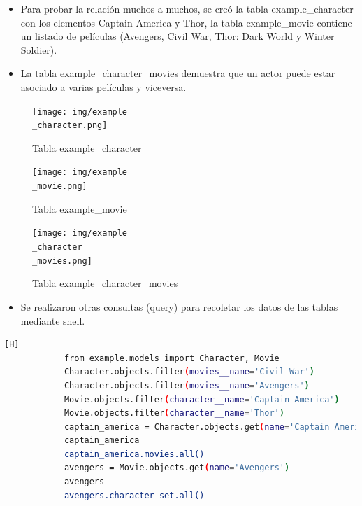 \documentclass{article}
\begin{document}
        \begin{itemize}
            \item Para probar la relación muchos a muchos, se creó la tabla example\_character con los elementos Captain America y Thor, la tabla example\_movie contiene un listado de películas (Avengers, Civil War, Thor: Dark World y Winter Soldier). 
            \item La tabla example\_character\_movies demuestra que un actor puede estar asociado a varias películas y viceversa.
        \end{itemize}    
        \begin{figure}[H]
        \centering
        \texttt{[image: img/example\\\_character.png]}
        \caption*{Tabla example\_character}
        \end{figure}
        \begin{figure}[ht]
        \centering
        \texttt{[image: img/example\\\_movie.png]}
        \caption*{Tabla example\_movie}
        \end{figure}
        \begin{figure}[ht]
        \centering
        \texttt{[image: img/example\\\_character\\\_movies.png]}
        \caption*{Tabla example\_character\_movies}
        \end{figure}
        
        \begin{itemize}
            \item Se realizaron otras consultas (query) para recoletar los datos de las tablas mediante shell.
        \end{itemize}
        \begin{lstlisting}[language=bash,caption={Many To Many Query}][H]
            from example.models import Character, Movie
            Character.objects.filter(movies__name='Civil War')
            Character.objects.filter(movies__name='Avengers')
            Movie.objects.filter(character__name='Captain America')
            Movie.objects.filter(character__name='Thor')
            captain_america = Character.objects.get(name='Captain America')
            captain_america
            captain_america.movies.all()
            avengers = Movie.objects.get(name='Avengers')
            avengers
            avengers.character_set.all()
	\end{lstlisting}
\end{document}
